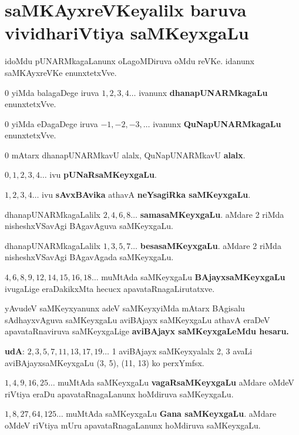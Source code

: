 \chapter{saMKAyxreVKeyalilx baruva vividhariVtiya saMKeyxgaLu}

\begin{figure}[!h]
\end{figure}
idoMdu pUNARMkagaLanunx oLagoMDiruva oMdu reVKe. idanunx saMKAyxreVKe enunxtetxVve.

$0$ yiMda balagaDege iruva $1,2,3,4\ldots$ ivanunx \textbf{dhanapUNARMkagaLu} enunxtetxVve.

$0$ yiMda eDagaDege iruva $-1, -2, -3, \ldots$ ivanunx \textbf{QuNapUNARMkagaLu} enunxtetxVve.

$0$ mAtarx dhanapUNARMkavU alalx, QuNapUNARMkavU \textbf{alalx}.

$0, 1, 2, 3, 4\ldots$ ivu \textbf{pUNaRsaMKeyxgaLu}.

$1, 2, 3, 4\ldots$ ivu \textbf{sAvxBAvika} athavA \textbf{neYsagiRka saMKeyxgaLu}.

dhanapUNARMkagaLalilx $2, 4, 6, 8\ldots$ \textbf{samasaMKeyxgaLu}. aMdare {\rm 2} riMda nisheshxVSavAgi BAgavAguva saMKeyxgaLu.

dhanapUNARMkagaLalilx $1, 3, 5, 7\ldots$ \textbf{besasaMKeyxgaLu}. aMdare {\rm 2} riMda nisheshxVSavAgi BAgavAgada saMKeyxgaLu.

$4, 6, 8, 9, 12, 14, 15, 16, 18\ldots$ muMtAda saMKeyxgaLu \textbf{BAjayxsaMKeyxgaLu} ivugaLige eraDakikxMta hecucx apavataRnagaLirutatxve.

yAvudeV saMKeyxyanunx adeV saMKeyxyiMda mAtarx BAgisalu sAdhayxvAguva saMKeyxgaLu aviBAjayx saMKeyxgaLu athavA eraDeV apavataRnaviruva saMKeyxgaLige \textbf{aviBAjayx saMKeyxgaLeMdu hesaru.}

\textbf{udA}: $2, 3, 5, 7, 11, 13, 17, 19 \ldots$ {\rm 1} aviBAjayx saMKeyxyalalx {\rm 2, 3} avaLi aviBAjayxsaMKeyxgaLu {\rm (3, 5)}, {\rm (11, 13)} ko perxYmfsx.

$1, 4, 9, 16, 25\ldots$ muMtAda saMKeyxgaLu \textbf{vagaRsaMKeyxgaLu} aMdare oMdeV riVtiya eraDu apavataRnagaLanunx hoMdiruva saMKeyxgaLu.

$1, 8, 27, 64, 125\ldots$ muMtAda saMKeyxgaLu \textbf{Gana saMKeyxgaLu}. aMdare oMdeV riVtiya mUru apavataRnagaLanunx hoMdiruva saMKeyxgaLu.

